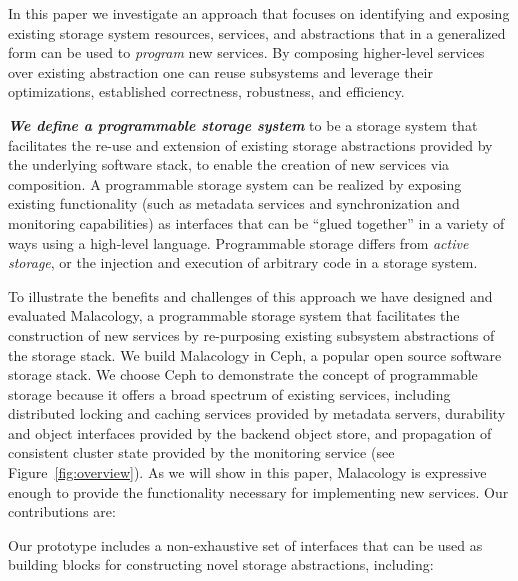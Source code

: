 \documentclass[preprint]{sigplanconf-eurosys}
\begin{document}
In this paper we investigate an approach that focuses on 
identifying and exposing existing
storage system resources, services, and abstractions that in a generalized form
can be used to \emph{program} new services. By composing higher-level services
over existing abstraction one can reuse
subsystems and leverage their optimizations, established correctness,
robustness, and efficiency. 

{\it \textbf{We define a programmable storage system}} to be a storage system that facilitates the 
re-use and extension of existing storage abstractions provided by the underlying software stack,
to enable the creation of new services via composition.
A programmable storage system can be realized by exposing existing functionality (such as 
metadata services and synchronization and monitoring capabilities) as interfaces that can be ``glued together''
in a variety of ways
using a high-level language.  Programmable storage differs from \emph{active storage},
or the injection and execution of arbitrary code in a storage system.


To illustrate the benefits and challenges of this approach we have designed and
evaluated Malacology, a programmable storage system 
that facilitates the construction of
new
services by re-purposing existing subsystem abstractions of the storage stack.
We build Malacology in Ceph, a popular open source software storage stack.
We choose Ceph to demonstrate the concept of programmable storage because it
offers a broad spectrum of existing services, including distributed locking and
caching services provided by metadata servers, durability and object interfaces
provided by the backend object store, and propagation of consistent
cluster state provided by the monitoring service (see
Figure~\ref{fig:overview}). As we will show in this paper, Malacology is
expressive enough to provide the functionality necessary for implementing new
services. Our contributions are:

Our prototype includes a non-exhaustive set of interfaces that can be used as building blocks
for constructing novel storage abstractions, including:
\end{document}
